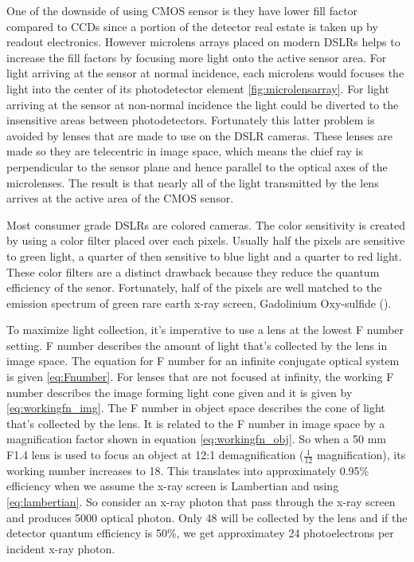 One of the downside of using CMOS sensor is they have lower fill factor compared to CCDs since a portion of the detector real estate is taken up by readout electronics.  However microlens arrays placed on modern DSLRs helps to increase the fill factors by focusing more light onto the active sensor area.  For light arriving at the sensor at normal incidence, each microlens would focuses the light into the center of its photodetector element \ref{fig:microlensarray}.  For light arriving at the sensor at non-normal incidence the light could be diverted to the insensitive areas between photodetectors.  Fortunately this latter problem is avoided by lenses that are made to use on the DSLR cameras.  These lenses are made so they are telecentric in image space, which means the chief ray is perpendicular to the sensor plane and hence parallel to the optical axes of the microlenses.  The result is that nearly all of the light transmitted by the lens arrives at the active area of the CMOS sensor.

Most consumer grade DSLRs are colored cameras.  The color sensitivity is created by using a color filter placed over each pixels.  Usually half the pixels are sensitive to green light, a quarter of then sensitive to blue light and a quarter to red light.  These color filters are a distinct drawback because they reduce the quantum efficiency of the senor.  Fortunately, half of the pixels are well matched to the emission spectrum of green rare earth x-ray screen, Gadolinium Oxy-sulfide ().

To maximize light collection, it's imperative to use a lens at the lowest F number setting.  F number describes the amount of light that's collected by the lens in image space.  The equation for F number for an infinite conjugate optical system is given \ref{eq:Fnumber}.  For lenses that are not focused at infinity, the working F number describes the image forming light cone given and it is given by \ref{eq:workingfn_img}.  The F number in object space describes the cone of light that's collected by the lens.  It is related to the F number in image space by a magnification factor shown in equation \ref{eq:workingfn_obj}.  So when a 50 mm F1.4 lens is used to focus an object at 12:1 demagnification ($\frac{1}{12}$ magnification), its working number increases to 18.  This translates into approximately 0.95\% efficiency when we assume the x-ray screen is Lambertian and using \eqref{eq:lambertian}.  So consider an x-ray photon that pass through the x-ray screen and produces 5000 optical photon.  Only 48 will be collected by the lens and if the detector quantum efficiency is 50\%, we get approximatey 24 photoelectrons per incident x-ray photon.

